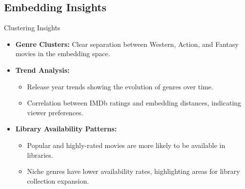 \documentclass{beamer}
\begin{document}
\subsection{Embedding Insights}
\begin{frame}{Clustering Insights}
  \begin{itemize}
    \item \textbf{Genre Clusters:} Clear separation between Western, Action, and Fantasy movies in the embedding space.
    \item \textbf{Trend Analysis:}
      \begin{itemize}
        \item Release year trends showing the evolution of genres over time.
        \item Correlation between IMDb ratings and embedding distances, indicating viewer preferences.
      \end{itemize}
    \item \textbf{Library Availability Patterns:}
      \begin{itemize}
        \item Popular and highly-rated movies are more likely to be available in libraries.
        \item Niche genres have lower availability rates, highlighting areas for library collection expansion.
      \end{itemize}
  \end{itemize}
\end{frame}
\end{document}
